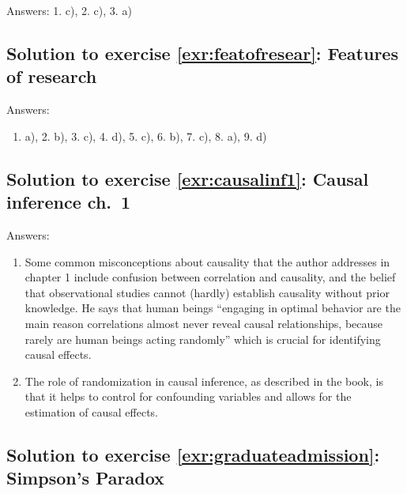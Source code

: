\documentclass[
  12pt,
  oneside]{book}
\providecommand{\tightlist}{%
  \setlength{\itemsep}{0pt}\setlength{\parskip}{0pt}}
\theoremstyle{definition}
\theoremstyle{definition}
\theoremstyle{definition}
\theoremstyle{definition}
\theoremstyle{remark}
\begin{document}
Answers: 1. c), 2. c), 3. a)

\hypertarget{sol:featofresear}{%
\subsection*{Solution to exercise \ref{exr:featofresear}: Features of research}\label{sol:featofresear}}

Answers:

\begin{enumerate}
\def\labelenumi{\arabic{enumi}.}
\tightlist
\item
  a), 2. b), 3. c), 4. d), 5. c), 6. b), 7. c), 8. a), 9. d)
\end{enumerate}

\hypertarget{sol:causalinf1}{%
\subsection*{Solution to exercise \ref{exr:causalinf1}: Causal inference ch.~1}\label{sol:causalinf1}}

Answers:

\begin{enumerate}
\def\labelenumi{\arabic{enumi}.}
\item
  Some common misconceptions about causality that the author addresses in chapter 1 include confusion between correlation and causality, and the belief that observational studies cannot (hardly) establish causality without prior knowledge. He says that human beings ``engaging in optimal behavior are the main reason correlations almost never reveal causal relationships, because rarely are human beings acting randomly'' which is crucial for identifying causal effects.
\item
  The role of randomization in causal inference, as described in the book, is that it helps to control for confounding variables and allows for the estimation of causal effects.
\end{enumerate}

\hypertarget{sol:graduateadmission}{%
\subsection*{Solution to exercise \ref{exr:graduateadmission}: Simpson's Paradox}\label{sol:graduateadmission}}
\end{document}
